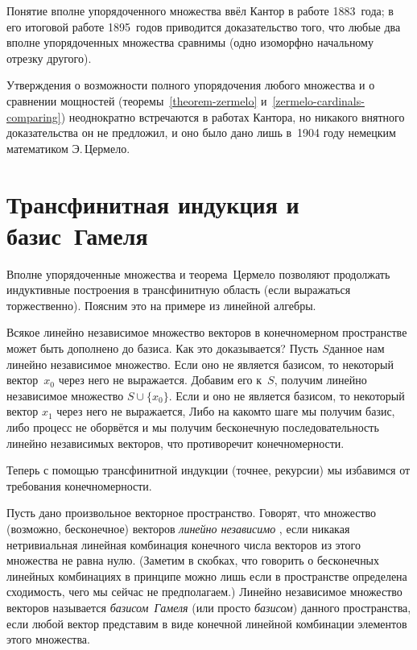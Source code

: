 \begin{historyremark}
Понятие вполне упорядоченного множества ввёл
Кантор
в работе 1883~года; в его итоговой работе 1895~годов приводится
доказательство того, что любые два вполне упорядоченных
множества сравнимы (одно изоморфно начальному отрезку другого).

Утверждения о возможности полного упорядочения любого множества
и о сравнении мощностей (теоремы~\ref{theorem-zermelo}
и~\ref{zermelo-cardinals-comparing}) неоднократно встречаются в
работах Кантора, но никакого внятного доказательства он не
предложил, и оно было дано лишь в~1904 году немецким математиком
Э.\,Цермело.
\end{historyremark}

\section{Трансфинитная индукция и базис~Гамеля}
     \label{hamel-base}%

Вполне упорядоченные множества и теорема~Цермело позволяют
продолжать индуктивные построения в трансфинитную область (если
выражаться торжественно). Поясним это на примере из линейной
алгебры.

Всякое линейно независимое множество векторов в конечномерном
пространстве может быть дополнено до базиса. Как это
доказывается? Пусть $S$\т данное нам линейно независимое
множество. Если оно не является базисом, то некоторый
вектор~$x_0$ через него не выражается. Добавим его к~$S$,
получим линейно независимое множество $S\cup\{x_0\}$. Если и оно
не является базисом, то некоторый вектор $x_1$ через него не
выражается,  Либо на каком\д то шаге мы получим базис, либо
процесс не оборвётся и мы получим бесконечную последовательность
линейно независимых векторов, что противоречит конечномерности.

Теперь с помощью трансфинитной индукции (точнее, рекурсии) мы
избавимся от требования конечномерности.

Пусть дано произвольное векторное пространство.
Го\-во\-рят, что множество (возможно, бесконечное) векторов
\emph{линейно независимо}%
, если никакая нетривиальная
линейная комбинация конечного числа векторов из этого множества не равна
нулю. (Заметим в скобках, что говорить о бесконечных линейных
комбинациях в принципе можно лишь если в пространстве определена
сходимость, чего мы сейчас не предполагаем.) Линейно независимое
множество векторов называется \emph{базисом~Гамеля}%
 (или просто
\emph{базисом}) данного пространства, если любой вектор представим
в виде конечной линейной комбинации элементов этого множества.


